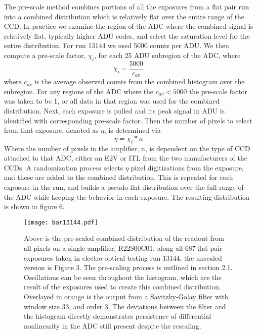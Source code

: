 \documentclass[11pt, letterpaper]{article}
\begin{document}
The pre-scale method combines portions of all the exposures from a flat pair run into a combined distribution which is relatively flat over the entire range of the CCD. 
In practice we examine the region of the ADC where the combined signal is relatively flat, typically higher ADU codes, and select the saturation level for the entire distribution. 
For run 13144 we used 5000 counts per ADU. 
 We then compute a pre-scale factor, $\chi _i$, for each 25 ADU subregion of the ADC, where
\begin{equation}\label{}
\chi_i = \frac{5000}{c_{av}}
\end{equation}
where $c_{av}$ is the average observed counts from the combined histogram over the subregion. 
For any regions of the ADC where the $c_{av} < 5000$ the pre-scale factor was taken to be 1, or all data in that region was used for the combined distribution. 
Next, each exposure is pulled and its peak signal in ADU is identified with corresponding pre-scale factor. 
Then the number of pixels to select from that exposure, denoted as $\eta $, is determined via
 \begin{equation}\label{}
 \eta = \chi_i *n 
\end{equation}
Where the number of pixels in the amplifier, n, is dependent on the type of CCD attached to that ADC, either an E2V or ITL from the two manufacturers of the CCDs. 
A randomization process selects $\eta$ pixel digitizations from the exposure, and these are added to the combined distribution. 
This is repeated for each exposure in the run, and builds a pseudo-flat distribution over the full range of the ADC while keeping the behavior in each exposure. 
The resulting distribution is shown in figure 6. 


\begin{figure}
	\texttt{[image: bar13144.pdf]}
	\caption{Above is the pre-scaled combined distribution of the readout from all pixels on a single amplifier, R22S00C01, along all 687 flat pair exposures taken in electro-optical testing run 13144, the unscaled version is Figure 3. The pre-scaling process is outlined in section 2.1. Oscillations can be seen throughout the histogram, which are the result of the exposures used to create this combined distribution. Overlayed in orange is the output from a Savitzky-Golay filter with window size 33, and order 3. The deviations between the filter and the histogram directly demonstrates persistence of differential nonlinearity in the ADC still present despite the rescaling.}
\end{figure}
\end{document}
